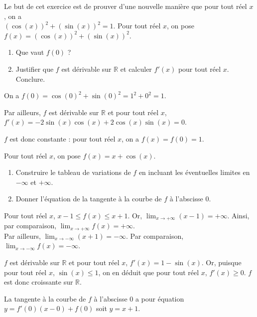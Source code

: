 \documentclass[11pt,fleqn, openany]{book} %
\begin{document}
\begin{exercise}[topic=trig02]Le but de cet exercice est de prouver d'une nouvelle manière que pour tout réel $x$, on a \\$(\cos(x))^2+(\sin(x))^2=1$. 
Pour tout réel $x$, on pose $f(x)=(\cos(x))^2+(\sin(x))^2$.
\begin{enumerate}
\item Que vaut $f(0)$ ?
\item Justifier que $f$ est dérivable sur $\mathbb{R}$ et calculer $f'(x)$ pour tout réel $x$. Conclure.
\end{enumerate}\end{exercise}

\begin{solution}On a $f(0)=\cos(0)^2+\sin(0)^2=1^2+0^2=1$.

Par ailleurs, $f$ est dérivable sur $\mathbb{R}$ et pour tout réel $x$, $f'(x)=-2\sin(x)\cos(x)+2\cos(x)\sin(x)=0$. 

$f$ est donc constante : pour tout réel $x$, on a $f(x)=f(0)=1$.\newpage
\end{solution}




\begin{exercise}[topic=trig02]Pour tout réel $x$, on pose $f(x)=x+\cos(x)$.
\begin{enumerate}
\item Construire le tableau de variations de $f$ en incluant les éventuelles limites en $-\infty$ et $+\infty$.
\item Donner l'équation de la tangente à la courbe de $f$ à l'abscisse 0.\end{enumerate}\end{exercise}

\begin{solution}Pour tout réel $x$, $x-1 \leqslant f(x) \leqslant x+1$. Or, $\displaystyle\lim_{x\to + \infty}(x-1)=+\infty$. Ainsi, par comparaison, $\displaystyle\lim_{x \to + \infty}f(x)= +\infty$.  \\Par ailleurs, $\displaystyle\lim_{x\to - \infty}(x+1)=-\infty$. Par comparaison, $\displaystyle\lim_{x \to -  \infty}f(x)=- \infty$.

$f$ est dérivable sur $\mathbb{R}$ et pour tout réel $x$, $f'(x)=1-\sin(x)$. Or, puisque pour tout réel $x$, $\sin(x)\leqslant 1$, on en déduit que pour tout réel $x$, $f'(x)\geqslant 0$. $f$ est donc croissante sur $\mathbb{R}$.

La tangente à la courbe de $f$ à l'abscisse 0 a pour équation $y=f'(0)(x-0)+f(0)$ soit $y=x+1$.\end{solution}
\end{document}
